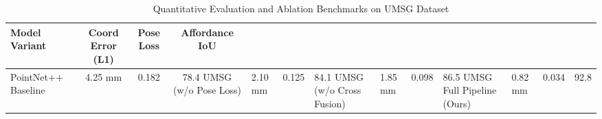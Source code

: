 \begin{table}[t]
\centering
\caption{Quantitative Evaluation and Ablation Benchmarks on UMSG Dataset}
\label{tab:table2_eval_results}
\begin{tabular*}{\linewidth}{l@{\extracolsep{\fill}}ccc}
\toprule
\textbf{Model Variant} & \textbf{Coord Error (L1)} & \textbf{Pose Loss} & \textbf{Affordance IoU} \\
\midrule
PointNet++ Baseline          & 4.25 mm      & 0.182      & 78.4%
UMSG (w/o Pose Loss)         & 2.10 mm      & 0.125      & 84.1%
UMSG (w/o Cross Fusion)      & 1.85 mm      & 0.098      & 86.5%
UMSG Full Pipeline (Ours)    & 0.82 mm      & 0.034      & 92.8%
\bottomrule
\end{tabular*}
\end{table}